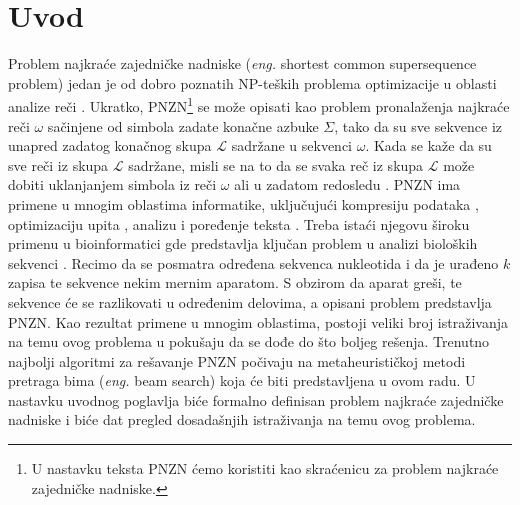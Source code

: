 \documentclass[12pt,oneside]{memoir}
\begin{document}
\frontmatter
\naslovna
\komisija
\apstrakt
\tableofcontents*

\mainmatter

\chapter{Uvod}
\label{chap:uvod}
Problem najkraće zajedničke nadniske (\textit{eng.} shortest common supersequence problem)
jedan je od dobro poznatih NP-teških problema optimizacije u oblasti analize reči \cite{ProbabilisticBS}.
Ukratko, PNZN\footnote{U nastavku teksta PNZN ćemo koristiti kao skraćenicu za problem najkraće zajedničke nadniske.}
se može opisati kao problem pronalaženja najkraće reči $\omega$ sačinjene
od simbola zadate konačne azbuke $\Sigma$, tako da su sve sekvence iz unapred zadatog konačnog skupa
$\mathcal{L}$ sadržane u sekvenci $\omega$. Kada se kaže da su sve reči iz skupa $\mathcal{L}$
sadržane, misli se na to da se svaka reč iz skupa $\mathcal{L}$ može dobiti uklanjanjem simbola iz reči $\omega$ ali 
u zadatom redosledu \cite{SCSSProblemDef}. PNZN ima primene u mnogim oblastima informatike, uključujući kompresiju podataka
\cite{DataCompression}, optimizaciju upita \cite{MQOptimization}, analizu i poređenje teksta \cite{SeqComparison, ITAlgorithms}.
Treba istaći njegovu široku primenu u bioinformatici gde predstavlja
ključan problem u analizi bioloških sekvenci \cite{SCSSBetterSolution}.
Recimo da se posmatra određena sekvenca nukleotida i da
je urađeno $k$ zapisa te sekvence nekim mernim aparatom.
S obzirom da aparat greši, te sekvence će se razlikovati u određenim
delovima, a opisani problem predstavlja PNZN.
Kao rezultat primene u mnogim oblastima, postoji veliki broj istraživanja na temu ovog problema u pokušaju da se dođe
do što boljeg rešenja. Trenutno najbolji algoritmi za rešavanje PNZN počivaju na metaheurističkoj metodi
pretraga bima (\textit{eng.} beam search) koja će biti predstavljena u ovom radu. U nastavku uvodnog poglavlja biće formalno
definisan problem najkraće zajedničke nadniske i biće dat pregled dosadašnjih istraživanja na temu ovog problema.
\end{document}
